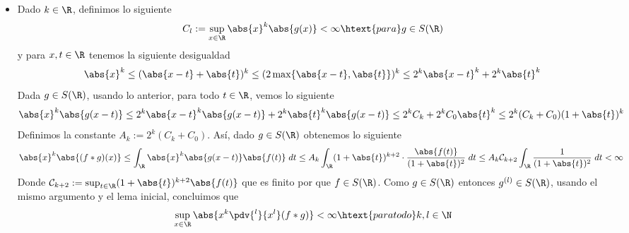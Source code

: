 \documentclass{article}
\begin{document}
\begin{enumerate}
\begin{itemize}
        \item Dado $k\in\R$, definimos lo siguiente
        \begin{equation*}
            C_{l}:=\sup_{x\in\R}\abs{x}^{k}\abs{g(x)}<\infty\htext{para}g\in S(\R)
        \end{equation*}
        y para $x,t\in\R$ tenemos la siguiente desigualdad
        \begin{equation*}
            \abs{x}^{k}\leq(\abs{x-t}+\abs{t})^{k}\leq(2\max\{\abs{x-t},{\abs{t}}\})^{k}
            \leq2^{k}\abs{x-t}^{k}+2^{k}\abs{t}^{k}
        \end{equation*}
        Dada $g\in S(\R)$, usando lo anterior, para todo $t\in\R$, vemos lo siguiente
        \begin{equation*}
            \abs{x}^{k}\abs{g(x-t)}\leq2^{k}\abs{x-t}^{k}\abs{g(x-t)}+2^{k}\abs{t}^{k}\abs{g(x-t)}
            \leq2^{k}C_{k}+2^{k}C_{0}\abs{t}^{k}\leq2^{k}(C_{k}+C_{0})(1+\abs{t})^{k}
        \end{equation*}
        Definimos la constante $A_{k}:=2^{k}(C_{k}+C_{0})$. Así, dado $g\in S(\R)$ obtenemos lo 
        siguiente
        \begin{align*}
            \abs{x}^{k}\abs{(f*g)(x)}\leq\int_{\R}\abs{x}^{k}\abs{g(x-t)}\abs{f(t)}\hspace{1mm}dt
            \leq A_{k}\int_{\R}(1+\abs{t})^{k+2}
            \cdot\frac{\abs{f(t)}}{(1+\abs{t})^{2}}\hspace{1mm}dt
            \leq A_{k}\mathcal{C}_{k+2}\int_{\R}\frac{1}{(1+\abs{t})^{2}}\hspace{1mm}dt<\infty
        \end{align*}
        Donde $\mathcal{C}_{k+2}:=\sup_{t\in\R}(1+\abs{t})^{k+2}\abs{f(t)}$ que es finito por que 
        $f\in S(\R)$. Como $g\in S(\R)$ entonces $g^{(l)}\in S(\R)$, usando el mismo argumento y 
        el lema inicial, concluimos que
        \begin{equation*}
            \sup_{x\in\R}\abs{x^{k}\pdv{^{l}}{x^{l}}(f*g)}<\infty\htext{para todo }k,l\in\N
        \end{equation*} 
    \end{itemize}
    

\end{enumerate}
\end{document}
